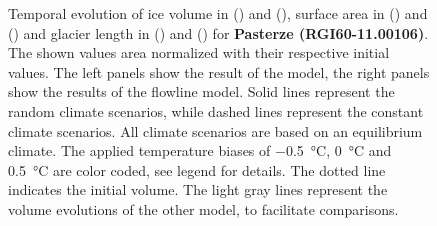 \begin{figure}[p]
  \caption{Temporal evolution of ice volume in () and (), surface area in () and () and glacier length in () and () for \textbf{Pasterze (RGI60-11.00106)}. The shown values area normalized with their respective initial values. The left panels show the result of the \vas{} model, the right panels show the results of the flowline model. Solid lines represent the random climate scenarios, while dashed lines represent the constant climate scenarios. All climate scenarios are based on an equilibrium climate. The applied temperature biases of \SI{-.5}{\celsius}, \SI{0}{\celsius} and \SI{+.5}{\celsius} are color coded, see legend for details. The dotted line indicates the initial volume. The light gray lines represent the volume evolutions of the other model, to facilitate comparisons.}
  \label{fig:Pasterze}
\end{figure}

